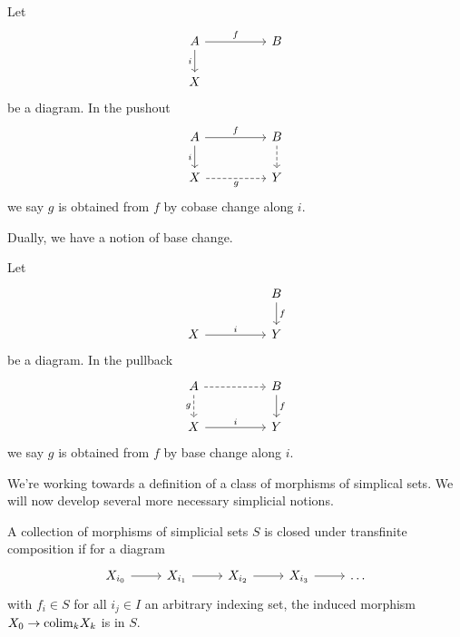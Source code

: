 \begin{definition}
  Let 
  $$%
  \begin{tikzcd}
    A && B \\
    X
    \arrow["i"', from=1-1, to=2-1]
    \arrow["f", from=1-1, to=1-3]
  \end{tikzcd}$$
  be a diagram. In the pushout
  $$%
  \begin{tikzcd}
    A && B \\
    X && Y
    \arrow["i"', from=1-1, to=2-1]
    \arrow["f", from=1-1, to=1-3]
    \arrow["g"', dashed, from=2-1, to=2-3]
    \arrow[dashed, from=1-3, to=2-3]
  \end{tikzcd}$$
  we say $g$ is obtained from $f$ by cobase change along $i$. 
\end{definition}
Dually, we have a notion of base change. 
\begin{definition}
  Let 
  $$%
  \begin{tikzcd}
    && B \\
    X && Y
    \arrow["i", from=2-1, to=2-3]
    \arrow["f", from=1-3, to=2-3]
  \end{tikzcd}$$
  be a diagram. In the pullback
  $$%
  \begin{tikzcd}
    A && B \\
    X && Y
    \arrow["i", from=2-1, to=2-3]
    \arrow["f", from=1-3, to=2-3]
    \arrow[dashed, from=1-1, to=1-3]
    \arrow["g"', dashed, from=1-1, to=2-1]
  \end{tikzcd}$$
  we say $g$ is obtained from $f$ by base change along $i$. 
\end{definition}
We're working towards a definition of a class of morphisms of simplical sets. We will now develop several more necessary simplicial notions. 
\begin{definition}
  A collection of morphisms of simplicial sets $S$ is closed under transfinite composition if for a diagram 
  $$%
  \begin{tikzcd}
    {X_{i_{0}}} & {X_{i_{1}}} & {X_{i_{2}}} & {X_{i_{3}}} & \dots
    \arrow[from=1-4, to=1-5]
    \arrow[from=1-3, to=1-4]
    \arrow[from=1-2, to=1-3]
    \arrow[from=1-1, to=1-2]
  \end{tikzcd}$$
  with $f_{i}\in S$ for all $i_{j}\in I$ an arbitrary indexing set, the induced morphism $X_{0}\to\mathrm{colim}_{k}X_{k}$ is in $S$.  
\end{definition}
